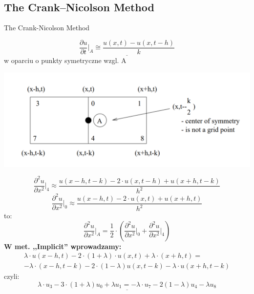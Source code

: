 
\subsection{The Crank--Nicolson Method}
\begin{frame}{The Crank-Nicolson Method}

\begin{block}{}
 \end{block}
 
\begin{equation}\underline{\frac{\partial u}{\partial t} \Big \vert _{A}\cong \frac{u(x,t) - u(x,t - h)}{k}}\end{equation} w oparciu o punkty symetryczne wzgl. A
 
 \centerline{\includegraphics[width = 1 \linewidth]{img/23/crank}}
\end{frame}

\begin{frame}
\begin{equation} \frac{\partial ^2 u}{\partial x^2} \Big \vert _{4}\approx \frac{u(x - h,t - k) - 2 \cdot u(x,t - h) + u(x + h, t-k)}{h^2}\end{equation}
\begin{equation} \frac{\partial ^2 u}{\partial x^2} \Big \vert _{0}\approx \frac{u(x - h,t) - 2 \cdot u(x,t) + u(x + h, t)}{h^2} \end{equation}
to:
\begin{equation} \frac{\partial ^2 u}{\partial x^2} \big \vert _{A} = \frac{1}{2} \cdot \left ( \frac{\partial ^2 u}{\partial x^2} \Big \vert _{0} + \frac{\partial ^2 u}{\partial x^2} \Big \vert _{4} \right )\end{equation}
\textbf{W met. ,,Implicit'' wprowadzamy:}
\begin{multline} \lambda \cdot u(x-h,t) - 2 \cdot (1+\lambda)\cdot u(x,t) + \lambda \cdot (x+h,t) = \\
 -\lambda \cdot (x-h,t-k) - 2 \cdot (1-\lambda)u(x,t-k) - \lambda \cdot u(x+h,t-k)\end{multline}
czyli:
$$ \underline{\lambda \cdot u_3 - 3\cdot (1+\lambda)u_0 + \lambda u_1 = -\lambda \cdot u_7 - 2(1-\lambda)u_4 - \lambda u_8}$$
\end{frame}
